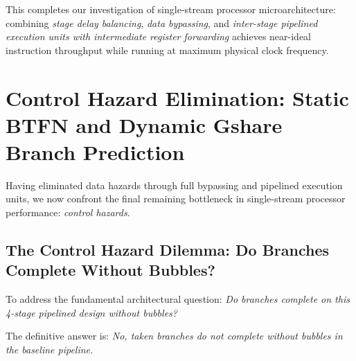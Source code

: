 This completes our investigation of single-stream processor microarchitecture: combining \textit{stage delay balancing}, \textit{data bypassing}, and \textit{inter-stage pipelined execution units with intermediate register forwarding} achieves near-ideal instruction throughput while running at maximum physical clock frequency.

\section{Control Hazard Elimination: Static BTFN and Dynamic Gshare Branch Prediction}\label{riscvBranchPrediction}

Having eliminated data hazards through full bypassing and pipelined execution units, we now confront the final remaining bottleneck in single-stream processor performance: \textit{control hazards}.

\subsection{The Control Hazard Dilemma: Do Branches Complete Without Bubbles?}

To address the fundamental architectural question: \textit{Do branches complete on this 4-stage pipelined design without bubbles?}

The definitive answer is: \textit{No, taken branches do not complete without bubbles in the baseline pipeline.}

